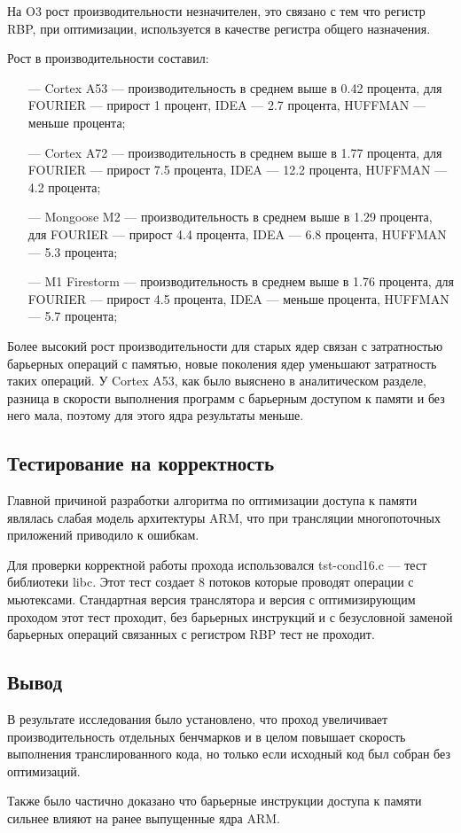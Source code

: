 На O3 рост производительности незначителен, это связано с тем что регистр RBP, при оптимизации, используется в качестве регистра общего назначения.

Рост в производительности составил:
\begin{itemize}[leftmargin=1.6\parindent]
	\item[---] Cortex A53 --- производительность в среднем выше в 0.42 процента, для FOURIER --- прирост 1 процент, IDEA --- 2.7 процента, HUFFMAN --- меньше процента;
	\item[---] Cortex A72 --- производительность в среднем выше в 1.77 процента, для FOURIER --- прирост 7.5 процента, IDEA --- 12.2 процента, HUFFMAN --- 4.2 процента;
	\item[---] Mongoose M2 --- производительность в среднем выше в 1.29 процента, для FOURIER --- прирост 4.4 процента, IDEA --- 6.8 процента, HUFFMAN --- 5.3 процента;
	\item[---] M1 Firestorm --- производительность в среднем выше в 1.76 процента, для FOURIER --- прирост 4.5 процента, IDEA --- меньше процента, HUFFMAN --- 5.7 процента;
\end{itemize}

Более высокий рост производительности для старых ядер связан с затратностью барьерных операций с памятью, новые поколения ядер уменьшают затратность таких операций. У Cortex A53, как было выяснено в аналитическом разделе, разница в скорости выполнения программ с барьерным доступом к памяти и без него мала, поэтому для этого ядра результаты меньше.

\subsection{Тестирование на корректность}

Главной причиной разработки алгоритма по оптимизации доступа к памяти являлась слабая модель архитектуры ARM, что при трансляции многопоточных приложений приводило к ошибкам.

Для проверки корректной работы прохода использовался tst-cond16.c --- тест библиотеки libc. Этот тест создает 8 потоков которые проводят операции с мьютексами. Стандартная версия транслятора и версия с оптимизирующим проходом этот тест проходит, без барьерных инструкций и с безусловной заменой барьерных операций связанных с регистром RBP тест не проходит.

\subsection{Вывод}

В результате исследования было установлено, что проход увеличивает производительность отдельных бенчмарков и в целом повышает скорость выполнения транслированного кода, но только если исходный код был собран без оптимизаций.

Также было частично доказано что барьерные инструкции доступа к памяти сильнее влияют на ранее выпущенные ядра ARM.
